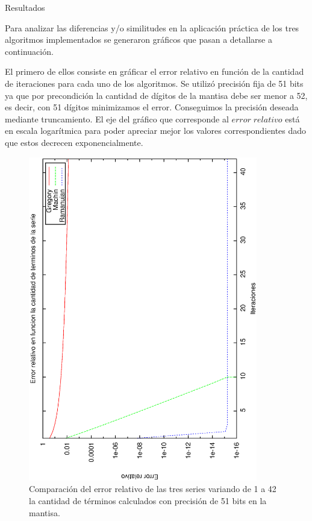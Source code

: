 \begin{section}{Resultados}

	Para analizar las diferencias y/o similitudes en la aplicación práctica de los tres algoritmos implementados se generaron gráficos que pasan a detallarse a continuación. 
		
	El primero de ellos consiste en gráficar el error relativo en función de la cantidad de iteraciones para cada uno de los algoritmos. Se utilizó precisión fija de 51 bits ya que por precondición la cantidad de dígitos de la mantisa debe ser menor a 52, es decir, con 51 dígitos minimizamos el error. Conseguimos la precisión deseada mediante truncamiento.
	El eje del gráfico que corresponde al $error\;relativo$ está en escala logarítmica para poder apreciar mejor los valores correspondientes dado que estos decrecen exponencialmente.

	\begin{figure}[H]
	  \centering
		\includegraphics[width=10cm,angle=-90]{graficos/comparacion_1a42it_51p.eps}
	  \caption{Comparación del error relativo de las tres series variando de 1 a 42 la cantidad de términos calculados con precisión de 51 bits en la mantisa.}
	  \label{fig:51p}
	\end{figure}
	

\end{section}
